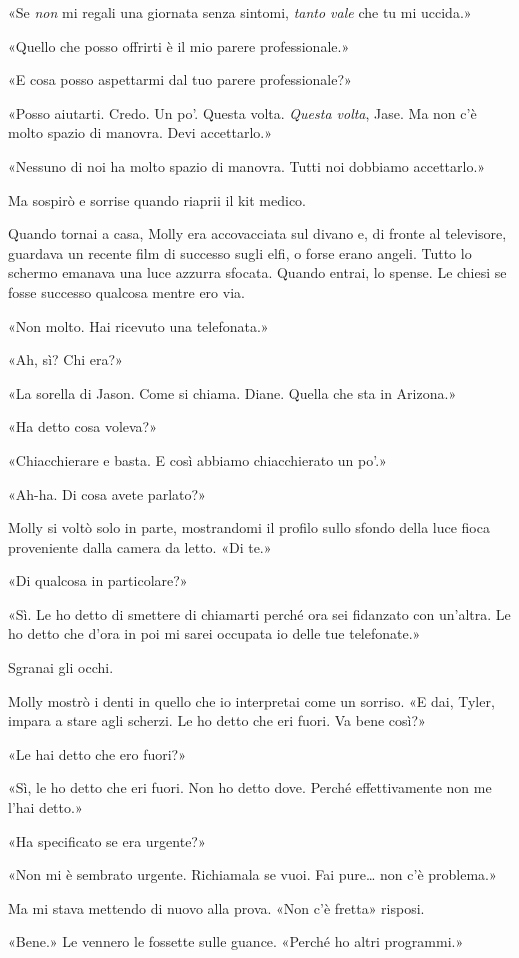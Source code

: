 «Se \emph{non} mi regali una giornata senza sintomi, \emph{tanto vale}
che tu mi uccida.»

«Quello che posso offrirti è il mio parere professionale.»

«E cosa posso aspettarmi dal tuo parere professionale?»

«Posso aiutarti. Credo. Un po'. Questa volta. \emph{Questa volta}, Jase.
Ma non c'è molto spazio di manovra. Devi accettarlo.»

«Nessuno di noi ha molto spazio di manovra. Tutti noi dobbiamo
accettarlo.»

Ma sospirò e sorrise quando riaprii il kit medico.

\separatorefiori

Quando tornai a casa, Molly era accovacciata sul divano e, di fronte al
televisore, guardava un recente film di successo sugli elfi, o forse
erano angeli. Tutto lo schermo emanava una luce azzurra sfocata. Quando
entrai, lo spense. Le chiesi se fosse successo qualcosa mentre ero via.

«Non molto. Hai ricevuto una telefonata.»

«Ah, sì? Chi era?»

«La sorella di Jason. Come si chiama. Diane. Quella che sta in Arizona.»

«Ha detto cosa voleva?»

«Chiacchierare e basta. E così abbiamo chiacchierato un po'.»

«Ah-ha. Di cosa avete parlato?»

Molly si voltò solo in parte, mostrandomi il profilo sullo sfondo della
luce fioca proveniente dalla camera da letto. «Di te.»

«Di qualcosa in particolare?»

«Sì. Le ho detto di smettere di chiamarti perché ora sei fidanzato con
un'altra. Le ho detto che d'ora in poi mi sarei occupata io delle tue
telefonate.»

Sgranai gli occhi.

Molly mostrò i denti in quello che io interpretai come un sorriso. «E
dai, Tyler, impara a stare agli scherzi. Le ho detto che eri fuori. Va
bene così?»

«Le hai detto che ero fuori?»

«Sì, le ho detto che eri fuori. Non ho detto dove. Perché effettivamente
non me l'hai detto.»

«Ha specificato se era urgente?»

«Non mi è sembrato urgente. Richiamala se vuoi. Fai pure\ldots{} non c'è
problema.»

Ma mi stava mettendo di nuovo alla prova. «Non c'è fretta» risposi.

«Bene.» Le vennero le fossette sulle guance. «Perché ho altri
programmi.»
